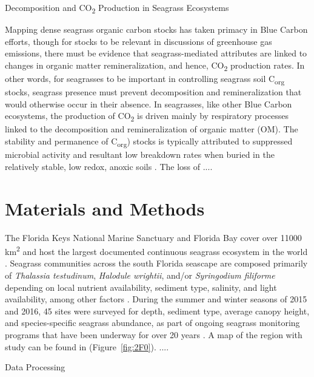 \bigskip
\noindent Decomposition and CO\textsubscript{2} Production in Seagrass Ecosystems
\medskip

Mapping dense seagrass organic carbon stocks has taken primacy in Blue Carbon efforts, though for stocks to be relevant in discussions of greenhouse gas emissions, there must be evidence that seagrass-mediated attributes are linked to changes in organic matter remineralization, and hence, CO\textsubscript{2} production rates. In other words, for seagrasses to be important in controlling seagrass soil C\textsubscript{org} stocks, seagrass presence must prevent decomposition and remineralization that would otherwise occur in their absence. In seagrasses, like other Blue Carbon ecosystems, the production of CO\textsubscript{2} is driven mainly by respiratory processes linked to the decomposition and remineralization of organic matter (OM). The stability and permanence of C\textsubscript{org}) stocks is typically attributed to suppressed microbial activity and resultant low breakdown rates when buried in the relatively stable, low redox, anoxic soils \citep{Duarte:2011da, Fourqurean:2012cv}. The loss of ....

\section{Materials and Methods}


The Florida Keys National Marine Sanctuary and Florida Bay cover over 11000 km\textsuperscript{2} and host the largest documented continuous seagrass ecosystem in the world \citep{Fourqurean:2002wr}. Seagrass communities across the south Florida seascape are composed primarily of \textit{Thalassia testudinum}, \textit{Halodule wrightii}, and/or \textit{Syringodium filiforme} depending on local nutrient availability, sediment type, salinity, and light availability, among other factors \citep{Fourqurean:1995uj, Fourqurean:2003vj}. During the summer and winter seasons of 2015 and 2016, 45 sites were surveyed for depth, sediment type, average canopy height, and species-specific seagrass abundance, as part of ongoing seagrass monitoring programs that have been underway for over 20 years \citep{Fourqurean:2002wr}. A map of the region with study can be found in (Figure~\ref{fig:2F0}). ....

\bigskip
\noindent Data Processing
\medskip

